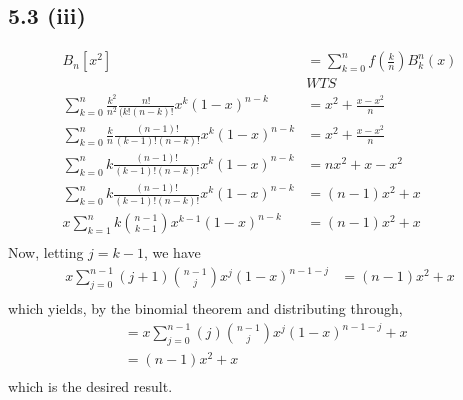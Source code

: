 \documentclass[letterpaper,12pt]{article}
\theoremstyle{definition}
\begin{document}
\subsection*{5.3 (iii)}

\begin{align*}
    B_n[x^2] &= \sum^{n}_{k = 0}  f(\frac{k}{n}) B_k^n(x) \\
    &WTS\\
    \sum^{n}_{k = 0}  \frac{k^2}{n^2} \frac{n!}{(k!(n-k)!}x^k(1-x)^{n-k} &= x^2 + \frac{x-x^2}{n} \\
    \sum^{n}_{k = 0}  \frac{k}{n} \frac{(n-1)!}{( k-1)!(n-k)!}x^k(1-x)^{n-k} &= x^2 + \frac{x-x^2}{n} \\
    \sum^{n}_{k = 0}  k \frac{(n-1)!}{( k-1)!(n-k)!}x^k(1-x)^{n-k} &= nx^2 + x-x^2 \\
    \sum^{n}_{k = 0}  k \frac{(n-1)!}{( k-1)!(n-k)!}x^k(1-x)^{n-k} &= (n-1)x^2 + x \\
    x\sum^{n}_{k = 1}  k \binom {n-1}{k-1}x^{k-1}(1-x)^{n-k} &= (n-1)x^2 + x \\
\end{align*}
Now, letting $j = k-1$, we have
\begin{align*}
    x\sum^{n-1}_{j = 0}  (j+1) \binom {n-1}{j}x^{j}(1-x)^{n-1-j} &= (n-1)x^2 + x \\
\end{align*}
which yields, by the binomial theorem and distributing through,
\begin{align*}
    &=x\sum^{n-1}_{j = 0}  (j) \binom {n-1}{j}x^{j}(1-x)^{n-1-j} + x \\
    &=(n-1)x^2 + x \\
\end{align*}
which is the desired result.
\end{document}
